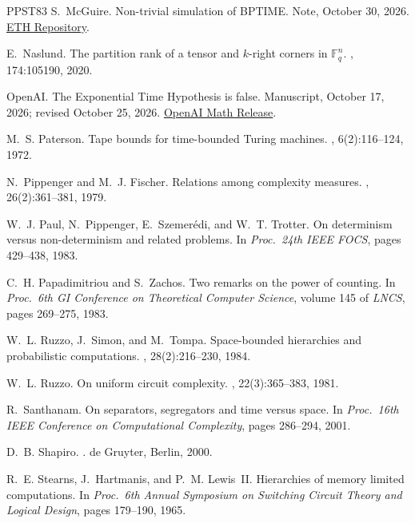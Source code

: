 \documentclass[11pt]{article}
\theoremstyle{definition}
\theoremstyle{definition}
\theoremstyle{remark}
\begin{document}
\begin{thebibliography}{PPST83}
S.~McGuire.
\newblock Non-trivial simulation of {BPTIME}.
\newblock Note, October 30, 2026. \href{https://drive.google.com/file/d/1baDrwOwTmXhucsBidIVig4VnKNj0TSMl/view}{ETH Repository}.

E.~Naslund.
\newblock The partition rank of a tensor and $k$-right corners in $\mathbb F_q^n$.
, 174:105190, 2020.

OpenAI.
\newblock The {E}xponential {T}ime {H}ypothesis is false.
\newblock Manuscript, October 17, 2026; revised October 25, 2026. \href{https://github.com/openai/math/blob/main/preprints/The-Exponential-Time-Hypothesis-is-False-October-25-2026/paper.pdf}{OpenAI Math Release}.

M.~S. Paterson.
\newblock Tape bounds for time-bounded {T}uring machines.
, 6(2):116--124, 1972.

N.~Pippenger and M.~J. Fischer.
\newblock Relations among complexity measures.
, 26(2):361--381, 1979.

W.~J. Paul, N.~Pippenger, E.~Szemer{\'e}di, and W.~T. Trotter.
\newblock On determinism versus non-determinism and related problems.
\newblock In {\em Proc.\ 24th IEEE FOCS}, pages 429--438, 1983.

C.~H. Papadimitriou and S.~Zachos.
\newblock Two remarks on the power of counting.
\newblock In {\em Proc.\ 6th GI Conference on Theoretical Computer Science}, volume 145 of {\em LNCS}, pages 269--275, 1983.

W.~L. Ruzzo, J.~Simon, and M.~Tompa.
\newblock Space-bounded hierarchies and probabilistic computations.
, 28(2):216--230, 1984.

W.~L. Ruzzo.
\newblock On uniform circuit complexity.
, 22(3):365--383, 1981.

R.~Santhanam.
\newblock On separators, segregators and time versus space.
\newblock In {\em Proc.\ 16th IEEE Conference on Computational Complexity}, pages 286--294, 2001.

D.~B. Shapiro.
.
\newblock de Gruyter, Berlin, 2000.

R.~E. Stearns, J.~Hartmanis, and P.~M. Lewis~II.
\newblock Hierarchies of memory limited computations.
\newblock In {\em Proc.\ 6th Annual Symposium on Switching Circuit Theory and Logical Design}, pages 179--190, 1965.


\end{thebibliography}
\end{document}
